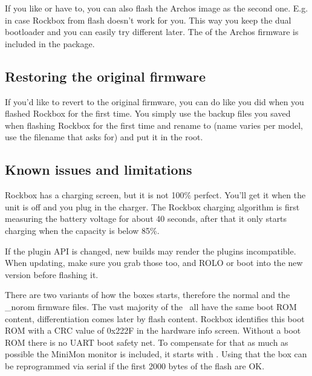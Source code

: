 If you like or have to, you can also flash the Archos image as the second one. 
E.g. in case Rockbox from flash doesn't work for you. This way you keep the dual 
bootloader and you can easily try different later. The  of the Archos
firmware is included in the package.

\subsection{Restoring the original firmware}
If you'd like to revert to the original firmware, you can do like you did when 
you flashed Rockbox for the first time. You simply use the backup files you saved
when flashing Rockbox for the first time and rename  to  (name varies per model, use the filename that  asks for) and put it in the root.

\subsection{Known issues and limitations}
Rockbox has a charging screen, but it is not 100\% perfect. You'll get it when 
the unit is off and you plug in the charger. The Rockbox charging algorithm is 
first measuring the battery voltage for about 40 seconds, after that it only 
starts charging when the capacity is below 85\%. 

If the plugin API is changed, new builds may render the plugins incompatible. 
When updating, make sure you grab those too, and ROLO or  boot into the 
new version before flashing it.

There are two variants of how the boxes starts, therefore the normal and the 
\_norom firmware files. The vast majority of the \daps\ all have the same boot 
ROM content, differentiation comes later by flash content. Rockbox identifies 
this boot ROM with a CRC value of 0x222F in the hardware info screen. 
Without a boot ROM  there is no UART boot safety net. To compensate for that as 
much as possible the MiniMon monitor is included, it starts with .
Using that the box can be reprogrammed via serial if the first 2000 bytes of the
flash are OK.

